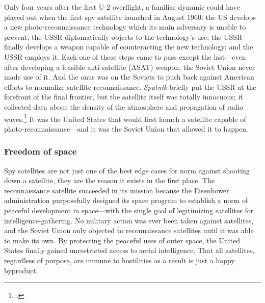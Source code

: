 \documentclass[14pt]{extarticle}
\begin{document}
Only four years after the first U-2 overflight, a familiar dynamic could have played out when the first spy satellite launched in August 1960: the US develops a new photo-reconnaissance technology which its main adversary is unable to prevent; the USSR diplomatically objects to the technology's use; the USSR finally develops a weapon capable of counteracting the new technology; and the USSR employs it. Each one of these steps came to pass except the last---even after developing a feasible anti-satellite (ASAT) weapon, the Soviet Union never made use of it. And the onus was on the Soviets to push back against American efforts to normalize satellite reconnaissance. \emph{Sputnik} briefly put the USSR at the forefront of the final frontier, but the satellite itself was totally innocuous; it collected data about the density of the atmosphere and propagation of radio waves.\footcite{nasa_sputnik_2019} It was the United States that would first launch a satellite capable of photo-reconnaissance---and it was the Soviet Union that allowed it to happen.

\subsubsection{Freedom of space}
Spy satellites are not just one of the best edge cases for norm against shooting down a satellite, they are the reason it exists in the first place. The reconnaissance satellite succeeded in its mission because the Eisenhower administration purposefully designed its space program to establish a norm of peaceful development in space---with the single goal of legitimizing satellites for intelligence-gathering. No military action was ever been taken against satellites, and the Soviet Union only objected to reconnaissance satellites until it was able to make its own. By protecting the peaceful uses of outer space, the United States finally gained unrestricted access to aerial intelligence. That all satellites, regardless of purpose, are immune to hostilities as a result is just a happy byproduct.
\end{document}
